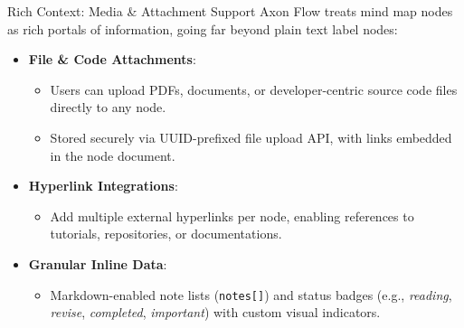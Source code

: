 \documentclass[aspectratio=169, 10pt]{beamer}
\begin{document}
\begin{frame}{Rich Context: Media \& Attachment Support}
  Axon Flow treats mind map nodes as rich portals of information, going far beyond plain text label nodes:
  \vspace{0.5em}
  \begin{itemize}
    \item[\textcolor{axonpurple}{\tiny$\blacksquare$}] \textbf{File \& Code Attachments}:
      \begin{itemize}
        \item Users can upload PDFs, documents, or developer-centric source code files directly to any node.
        \item Stored securely via UUID-prefixed file upload API, with links embedded in the node document.
      \end{itemize}
    \item[\textcolor{axonpurple}{\tiny$\blacksquare$}] \textbf{Hyperlink Integrations}:
      \begin{itemize}
        \item Add multiple external hyperlinks per node, enabling references to tutorials, repositories, or documentations.
      \end{itemize}
    \item[\textcolor{axonpurple}{\tiny$\blacksquare$}] \textbf{Granular Inline Data}:
      \begin{itemize}
        \item Markdown-enabled note lists (\texttt{notes[]}) and status badges (e.g., \textit{reading}, \textit{revise}, \textit{completed}, \textit{important}) with custom visual indicators.
      \end{itemize}
  \end{itemize}
\end{frame}
\end{document}
